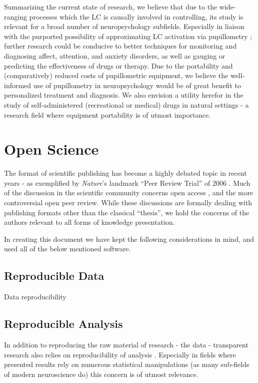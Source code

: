 	Summarizing the current state of research, we believe that due to the wide-ranging processes which the LC is causally involved in controlling, its study is relevant for a broad number of neuropsychology subfields.
	Especially in liaison with the purported possibility of approximating LC activation via pupillometry \cite{Gilzenrat2010,Murphy2011}; further research could be conducive to better techniques for monitoring and diagnosing affect, attention, and anxiety disorders, as well as gauging or predicting the effectiveness of drugs or therapy.
	Due to the portability \cite{Bradley2010} and (comparatively) reduced costs of pupillometric equipment, we believe the well-informed use of pupillometry in neuropsychology would be of great benefit to personalized treatment and diagnosis.
	We also envision a utility herefor in the study of self-administered (recreational or medical) drugs in natural settings - a research field where equipment portability is of utmost importance. 

\iffalse
    \section{Open Science}\label{sec:b_os}
	The format of scientific publishing has become a highly debated topic in recent years - as exemplified by \textit{Nature}'s landmark “Peer Review Trial” of 2006 \cite{Nature-debate2006}.
	Much of the discussion in the scientific community concerns open access \cite{VanNoorden2013,Parker2013}, and the more controversial open peer review.
	While these discussions are formally dealing with publishing formats other than the classical “thesis”, we hold the concerns of the authors relevant to all forms of knowledge presentation.
	
	In creating this document we have kept the following considerations in mind, and used all of the below mentioned software.
	\subsection{Reproducible Data}\label{sec:b_rr}
	    Data reproducibility 
	\subsection{Reproducible Analysis}\label{sec:b_ra}
	    In addition to reproducing the raw material of research - the data - transparent research also relies on reproducibility of analysis \cite{Peng2009}.
	    Especially in fields where presented results rely on numerous statistical manipulations (as many sub-fields of modern neuroscience do) this concern is of utmost relevance.
	    	    
